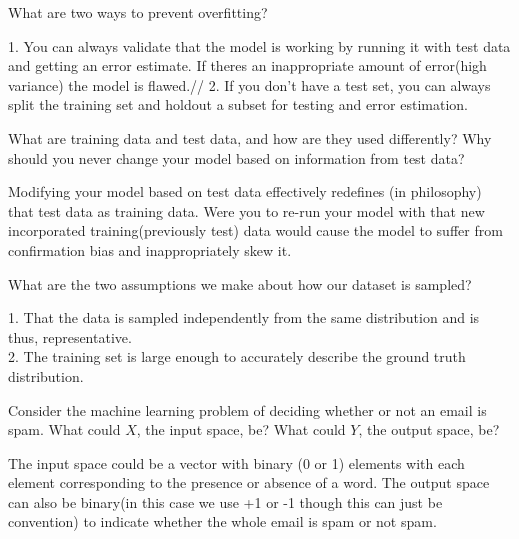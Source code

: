 \begin{problem}[2]
  What are two ways to prevent overfitting?
\end{problem}
\begin{solution}
  1. You can always validate that the model is working by running it with test data and getting an error estimate. If theres an inappropriate amount of error(high variance) the model is flawed.//
  2. If you don't have a test set, you can always split the training set and holdout a subset for testing and error estimation.
\end{solution}

\begin{problem}[2]
  What are training data and test data, and how are they used differently? Why should you never change your model based on information from test data?
\end{problem}
\begin{solution}
  Modifying your model based on test data effectively redefines (in philosophy) that test data as training data. Were you to re-run your model with that new incorporated training(previously test) data would cause the model to suffer from confirmation bias and inappropriately skew it.
\end{solution}

\begin{problem}[2]
  What are the two assumptions we make about how our dataset is sampled?
\end{problem}
\begin{solution}
  1. That the data is sampled independently from the same distribution and is thus, representative.\\
  2. The training set is large enough to accurately describe the ground truth distribution.
\end{solution}

\begin{problem}[2]
  Consider the machine learning problem of deciding whether or not an email is spam. What could $X$, the input space, be? What could $Y$, the output space, be?
\end{problem}
\begin{solution}
  The input space could be a vector with binary (0 or 1) elements with each element corresponding to the presence or absence of a word. The output space can also be binary(in this case we use +1 or -1 though this can just be convention) to indicate whether the whole email is spam or not spam.
\end{solution}

